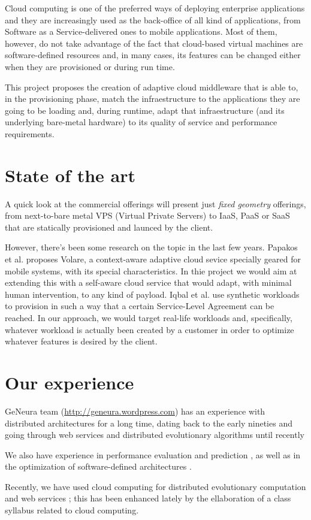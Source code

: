 \documentclass[a4paper]{article}
\begin{document}
Cloud computing is one of the preferred ways of deploying enterprise
applications and they are increasingly used as the back-office of all
kind of applications, from Software as a Service-delivered ones to
mobile applications. Most of them, however, do not take advantage of
the fact that cloud-based virtual machines are software-defined
resources and, in many cases, its features can be changed either when
they are provisioned or during run time.

This project proposes the creation of adaptive cloud middleware that
is able to, in the provisioning phase, match the infraestructure to
the applications they are going to be loading and, during runtime,
adapt that infraestructure (and its underlying bare-metal hardware) to
its quality of service and performance requirements. 

\section{State of the art}

A quick look at the commercial offerings will present just {\em fixed
  geometry} offerings, from next-to-bare metal VPS (Virtual Private
Servers) to IaaS, PaaS or SaaS that are statically provisioned and
launced by the client.

However, there's been some research on the topic in the last few
years. Papakos et al. \cite{Papakos} proposes
Volare, a context-aware adaptive cloud sevice specially geared for
mobile systems, with its special characteristics. In thie project we
would aim at extending this with a self-aware cloud service that would
adapt, with minimal human intervention, to any kind of payload. Iqbal
et al. \cite{Iqbal2011871} use synthetic workloads to provision in
such a way that a certain Service-Level Agreement can be reached. In
our approach, we would target real-life workloads and, specifically,
whatever workload is actually been created by a customer in order to
optimize whatever features is desired by the client.

\section{Our experience}

GeNeura team (\url{http://geneura.wordpress.com}) has an experience with
distributed architectures for a long time, dating back to the early
nineties \cite{parallel90} and going through web services and
distributed evolutionary algorithms until recently
\cite{Jini:FEA2000,agajaj,LNCS44480129,Araujo2010}

We also have experience in performance evaluation and prediction
\cite{castillo:evostar08,hardwareevo}, as well as in the optimization of
software-defined architectures \cite{gecco08:castillo}.

Recently, we have used cloud computing for distributed evolutionary
computation \cite{sofea:naco,mericloud} and web services
\cite{DBLP:journals/soco/Garcia-SanchezGCAG13}; this has been enhanced
lately 
by the ellaboration of a class syllabus related to cloud computing. 




\end{document}
